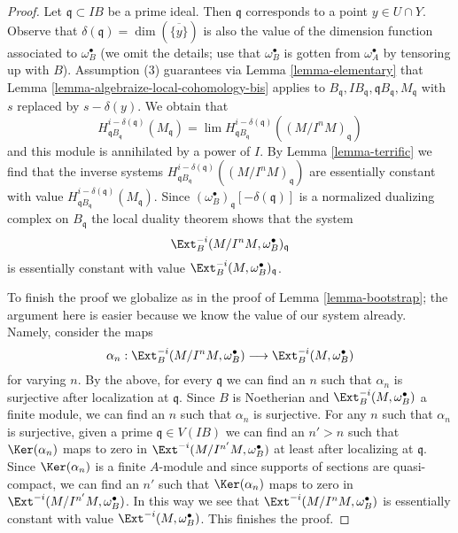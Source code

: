 \begin{proof}
\medskip\noindent
Let $\mathfrak q \subset IB$ be a prime ideal. Then $\mathfrak q$ corresponds
to a point $y \in U \cap Y$. Observe that
$\delta(\mathfrak q) = \dim(\overline{\{y\}})$
is also the value of the dimension function associated to $\omega_B^\bullet$
(we omit the details; use that $\omega_B^\bullet$ is gotten from
$\omega_A^\bullet$ by tensoring up with $B$). Assumption
(3) guarantees via Lemma \ref{lemma-elementary}
that Lemma \ref{lemma-algebraize-local-cohomology-bis}
applies to
$B_\mathfrak q, IB_\mathfrak q, \mathfrak qB_\mathfrak q, M_\mathfrak q$
with $s$ replaced by $s - \delta(y)$. We obtain that
$$
H^{i - \delta(\mathfrak q)}_{\mathfrak qB_\mathfrak q}(M_\mathfrak q) =
\lim H^{i - \delta(\mathfrak q)}_{\mathfrak qB_\mathfrak q}(
(M/I^nM)_\mathfrak q)
$$
and this module is annihilated by a power of $I$.
By Lemma \ref{lemma-terrific} we find that the inverse systems
$H^{i - \delta(\mathfrak q)}_{\mathfrak qB_\mathfrak q}((M/I^nM)_\mathfrak q)$
are essentially constant with value
$H^{i - \delta(\mathfrak q)}_{\mathfrak qB_\mathfrak q}(M_\mathfrak q)$.
Since $(\omega_B^\bullet)_\mathfrak q[-\delta(\mathfrak q)]$ is a normalized
dualizing complex on $B_\mathfrak q$ the local duality theorem
shows that the system
$$
\Ext^{-i}_B(M/I^n M, \omega_B^\bullet)_\mathfrak q
$$
is essentially constant with value
$\Ext^{-i}_B(M, \omega_B^\bullet)_\mathfrak q$.

\medskip\noindent
To finish the proof we globalize as in the proof of
Lemma \ref{lemma-bootstrap}; the argument here is easier
because we know the value of our system already. Namely, consider the maps
$$
\alpha_n :
\Ext^{-i}_B(M/I^n M, \omega_B^\bullet)
\longrightarrow
\Ext^{-i}_B(M, \omega_B^\bullet)
$$
for varying $n$. By the above, for every $\mathfrak q$ we can find an
$n$ such that $\alpha_n$ is surjective after localization at $\mathfrak q$.
Since $B$ is Noetherian and $\Ext^{-i}_B(M, \omega_B^\bullet)$
a finite module, we can find an $n$ such that $\alpha_n$ is surjective.
For any $n$ such that $\alpha_n$ is surjective, given a prime
$\mathfrak q \in V(IB)$ we can find an $n' > n$ such that
$\Ker(\alpha_n)$ maps to zero in $\Ext^{-i}(M/I^{n'}M, \omega_B^\bullet)$
at least after localizing at $\mathfrak q$.
Since $\Ker(\alpha_n)$ is a finite $A$-module and since supports of
sections are quasi-compact, we can find an $n'$ such that
$\Ker(\alpha_n)$ maps to zero in $\Ext^{-i}(M/I^{n'}M, \omega_B^\bullet)$.
In this way we see that $\Ext^{-i}(M/I^n M, \omega_B^\bullet)$
is essentially constant with value $\Ext^{-i}(M, \omega_B^\bullet)$.
This finishes the proof.
\end{proof}

